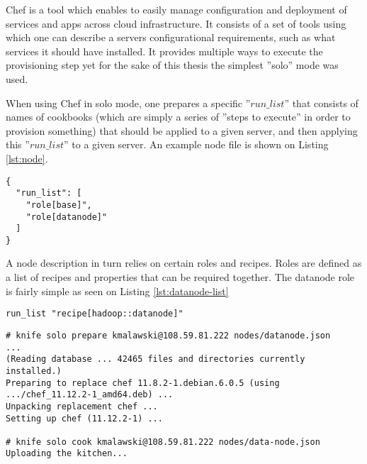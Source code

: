 Chef is a tool which enables to easily manage configuration and deployment of services and apps across cloud infrastructure. It consists of a set of tools using which one can describe a servers configurational requirements, such as what services it should have installed. It provides multiple ways to execute the provisioning step yet for the sake of this thesis the simplest ''solo'' mode was used. 

When using Chef in solo mode, one prepares a specific ''$run\_list$'' that consists of names of cookbooks (which are simply a series of ''steps to execute'' in order to provision something) that should be applied to a given server, and then applying this ''$run\_list$'' to a given server. An example node file is shown on Listing \ref{lst:node}.

\begin{lstlisting}[caption={Example data-node.json file}]
{
  "run_list": [
    "role[base]",
    "role[datanode]"
  ]
}
\end{lstlisting}

A node description in turn relies on certain roles and recipes. Roles are defined as a list of recipes and properties that can be required together. The datanode role is fairly simple as seen on Listing \ref{lst:datanode-list}

\begin{lstlisting}[caption={Example roles/datanode.rb file}]
run_list "recipe[hadoop::datanode]"
\end{lstlisting}



\begin{lstlisting}[caption={Preparing and Cooking a server with in order to prepare it for becoming a Hadoop data-node},label={lst:cheffing-data-node}]
# knife solo prepare kmalawski@108.59.81.222 nodes/datanode.json
...
(Reading database ... 42465 files and directories currently installed.)
Preparing to replace chef 11.8.2-1.debian.6.0.5 (using .../chef_11.12.2-1_amd64.deb) ...
Unpacking replacement chef ...
Setting up chef (11.12.2-1) ...

# knife solo cook kmalawski@108.59.81.222 nodes/data-node.json
Uploading the kitchen...

\end{lstlisting}













